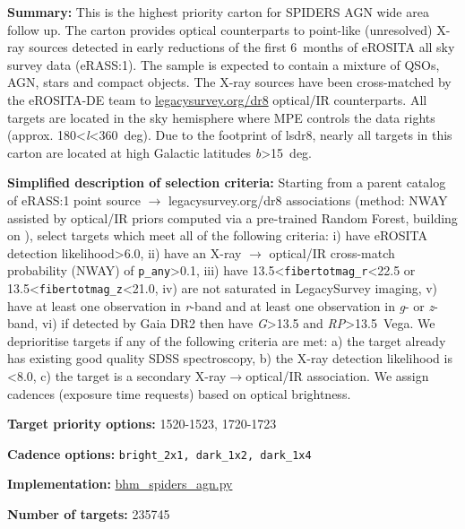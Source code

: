 \noindent\textbf{Summary:} This is the highest priority carton for SPIDERS AGN
wide area follow up. The carton provides optical counterparts to
point-like (unresolved) X-ray sources detected in early reductions of
the first 6~months of eROSITA all sky survey data (eRASS:1). The sample
is expected to contain a mixture of QSOs, AGN, stars and compact
objects. The X-ray sources have been cross-matched by the eROSITA-DE
team to \href{https://www.legacysurvey.org/dr8/}{legacysurvey.org/dr8}
optical/IR counterparts. All targets are located in the sky hemisphere
where MPE controls the data rights (approx.
180\textless{}\emph{l}\textless360~deg). Due to the footprint of lsdr8,
nearly all targets in this carton are located at high Galactic latitudes
\textbar{}\emph{b}\textbar\textgreater15~deg.

\noindent\textbf{Simplified description of selection criteria:} Starting from a
parent catalog of eRASS:1 point source $\rightarrow$ legacysurvey.org/dr8
associations (method: NWAY assisted by optical/IR priors computed via a
pre-trained Random Forest, building on
\citealt{Salvato2022}), select targets which meet all of the following criteria:
i) have eROSITA detection likelihood\textgreater6.0, ii) have an X-ray $\rightarrow$
optical/IR cross-match probability (NWAY) of
\texttt{p\_any}\textgreater0.1, iii) have
13.5\textless{}\texttt{fibertotmag\_r}\textless22.5 or
13.5\textless{}\texttt{fibertotmag\_z}\textless21.0, iv) are not
saturated in LegacySurvey imaging, v) have at least one observation in
\emph{r}-band and at least one observation in \emph{g}- or
\emph{z}-band, vi) if detected by Gaia DR2 then have
\emph{G}\textgreater13.5 and \emph{RP}\textgreater13.5~Vega. We
deprioritise targets if any of the following criteria are met: a) the
target already has existing good quality SDSS spectroscopy, b) the X-ray
detection likelihood is \textless8.0, c) the target is a secondary
X-ray$\rightarrow$optical/IR association. We assign cadences (exposure time
requests) based on optical brightness.


\noindent\textbf{Target priority options:} 1520-1523, 1720-1723

\noindent\textbf{Cadence options:} \texttt{bright\_2x1,\ dark\_1x2,\ dark\_1x4}

\noindent\textbf{Implementation:}
\href{https://github.com/sdss/target_selection/blob/0.3.0/python/target_selection/cartons/bhm_spiders_agn.py}{bhm\_spiders\_agn.py}

\noindent\textbf{Number of targets:} 235745

